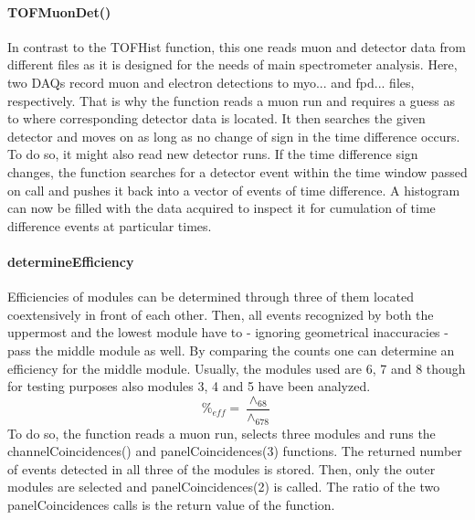     \paragraph{TOFMuonDet()}
    \label{ch:Analysis software:sec:methods of the class run:subsec:TOFMuonDet()}
    
    In contrast to the TOFHist function, this one reads muon and detector data from different files as it is designed for the needs of main spectrometer analysis. Here, two DAQs record muon and electron detections to myo... and fpd... files, respectively. That is why the function reads a muon run and requires a guess as to where corresponding detector data is located. It then searches the given detector and moves on as long as no change of sign in the time difference occurs. To do so, it might also read new detector runs. If the time difference sign changes, the function searches for a detector event within the time window passed on call and pushes it back into a vector of events of time difference. 
    A histogram can now be filled with the data acquired to inspect it for cumulation of time difference events at particular times.
    
    \paragraph{determineEfficiency}
    \label{ch:Analysis software:sec:methods of the class run:subsec:determineEfficiency}
    
    Efficiencies of modules can be determined through three of them located coextensively in front of each other. Then, all events recognized by both the uppermost and the lowest module have to - ignoring geometrical inaccuracies - pass the middle module as well. By comparing the counts one can determine an efficiency for the middle module. Usually, the modules used are 6, 7 and 8 though for testing purposes also modules 3, 4 and 5 have been analyzed. 
    \begin{equation}
    	\%_{eff} = \frac{\wedge_{68}}{{\wedge_{678}}}
    \end{equation}
    To do so, the function reads a muon run, selects three modules and runs the channelCoincidences() and panelCoincidences(3) functions. The returned number of events detected in all three of the modules is stored. Then, only the outer modules are selected and panelCoincidences(2) is called. The ratio of the two panelCoincidences calls is the return value of the function.
    
